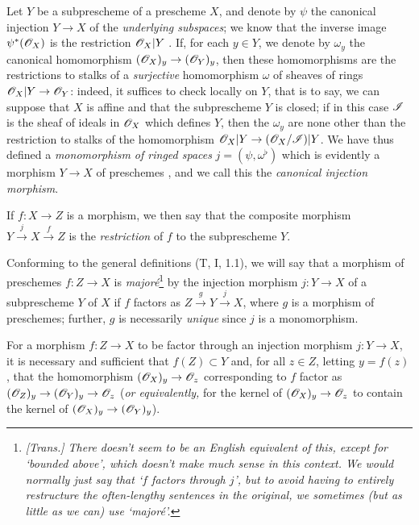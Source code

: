 \begin{env}[4.1.7]
\label{I.4.1.7}
Let $Y$ be a subprescheme of a prescheme $X$, and denote by $\psi$ the canonical injection $Y\to X$ of the \emph{underlying subspaces};
we know that the inverse image $\psi^*(\mathscr{O}_X)$ is the restriction $\mathscr{O}_X|Y$ .
If, for each $y\in Y$, we denote by $\omega_y$ the canonical homomorphism $(\sh{O}_X)_y\to(\sh{O}_Y)_y$, then these homomorphisms are the restrictions to stalks of a \emph{surjective} homomorphism $\omega$ of sheaves of rings $\sh{O}_X|Y\to\sh{O}_Y$: indeed, it suffices to check locally on $Y$, that is to say, we can suppose that $X$ is affine and that the subprescheme $Y$ is closed; if in this case $\mathscr{I}$ is the sheaf of ideals in $\mathscr{O}_X$ which defines $Y$, then the $\omega_y$ are none other than the restriction to stalks of the homomorphism $\sh{O}_X|Y\to(\sh{O}_X/\sh{I})|Y$.
We have thus defined a \emph{monomorphism of ringed spaces}  $j=(\psi,\omega^\flat)$ which is evidently a morphism $Y\to X$ of preschemes , and we call this the \emph{canonical injection morphism}.

If $f:X\to Z$ is a morphism, we then say that the composite morphism $Y\xrightarrow{j}X\xrightarrow{f}Z$ is the \emph{restriction} of $f$ to the subprescheme $Y$.
\end{env}

\begin{env}[4.1.8]
\label{I.4.1.8}
Conforming to the general definitions (T, I, 1.1), we will say that a morphism of preschemes $f:Z\to X$ is \emph{major\'e}\footnote{\emph{[Trans.] There doesn't seem to be an English equivalent of this, except for `bounded above', which doesn't make much sense in this context. We would normally just say that `$f$ factors through $j$', but to avoid having to entirely restructure the often-lengthy sentences in the original, we sometimes (but as little as we can) use `major\'e'.}} by the injection morphism $j:Y\to X$ of a subprescheme $Y$ of $X$ if $f$ factors as $Z\xrightarrow{g}Y\xrightarrow{j}X$, where $g$ is a morphism of preschemes;
further, $g$ is necessarily \emph{unique} since $j$ is a monomorphism.
\end{env}

\begin{proposition}[4.1.9]
\label{I.4.1.9}
For a morphism $f:Z\to X$ to be factor through an injection morphism $j:Y\to X$, it is necessary and sufficient that $f(Z)\subset Y$ and, for all $z\in Z$, letting $y=f(z)$, that the homomorphism $(\sh{O}_X)_y\to\sh{O}_z$ corresponding to $f$ factor as $(\sh{O}_Z)_y\to(\sh{O}_Y)_y\to\sh{O}_z$ (\emph{or equivalently,} for the kernel of $(\sh{O}_X)_y\to\sh{O}_z$ to contain the kernel of $(\sh{O}_X)_y\to(\sh{O}_Y)_y$).
\end{proposition}

